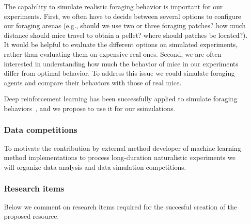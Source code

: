 The capability to simulate realistic foraging behavior is important for our
experiments. First, we often have to decide between several options to
configure our foraging arenas (e.g., should we use two or three foraging
patches? how much distance should mice travel to obtain a pellet? where should
patches be located?). It would be helpful to evaluate the different options on
simulated experiments, rather than evaluating them on expensive real
ones. Second, we are often interested in understanding how much the
behavior of mice in our experiments differ from optimal behavior. To address
this issue we could simulate foraging agents and
compare their behaviors with those of real mice.

Deep reinforcement learning has been successfully applied to simulate 
foraging behaviors~\citep{wispinskiEtAl22}, and we propose to use it for our
ssimulations.

\subsubsection{Data competitions}

To motivate the contribution by external method developer of machine learning method implementations to process long-duration naturalistic experiments we will organize data analysis and data simulation competitions.

\subsubsection{Research items}

Below we comment on research items required for the succesful creation of the
proposed resource.

